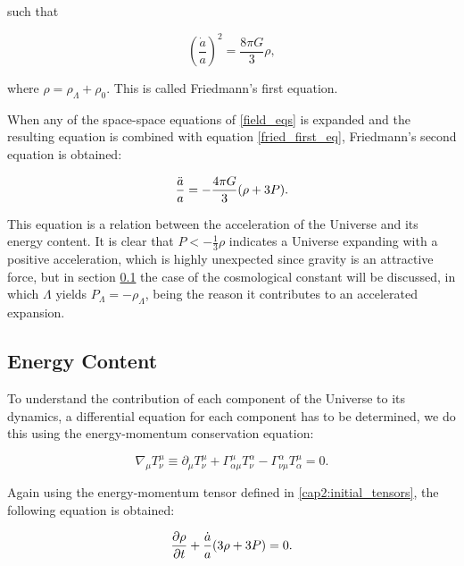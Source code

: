 \documentclass[openany,a4paper,12pt,oneside]{book}
\begin{document}
\begin{spacing}{1.5}
\noindent such that

\begin{equation}\label{fried_first_eq}
    \left(\frac{\dot{a}}{a}\right)^2=\frac{8\pi G}{3}\rho,
\end{equation}

\noindent where $\rho=\rho_\Lambda+\rho_0$. This is called Friedmann's first equation. 

When any of the space-space equations of \eqref{field_eqs} is expanded and the resulting equation is combined with equation \eqref{fried_first_eq}, Friedmann's second equation is obtained:

\begin{equation}\label{fried_second_eq}
    \frac{\Ddot{a}}{a}=-\frac{4\pi G}{3}(\rho+3P).
\end{equation}

This equation is a relation between the acceleration of the Universe and its energy content. It is clear that $P<-\frac{1}{3}\rho$ indicates a Universe expanding with a positive acceleration, which is highly unexpected since gravity is an attractive force, but in section \ref{subsect:Ch2_Energy_Content} the case of the cosmological constant will be discussed, in which $\Lambda$ yields $P_\Lambda=-\rho_\Lambda$, being the reason it contributes to an accelerated expansion.

\subsection{Energy Content}\label{subsect:Ch2_Energy_Content}

To understand the contribution of each component of the Universe to its dynamics, a differential equation for each component has to be determined, we do this using the energy-momentum conservation equation:

\begin{equation}\label{energy_momentum_conservation}
    \nabla_\mu T^\mu_\nu\equiv \partial_\mu T^\mu_\nu+\Gamma^\mu_{\alpha\mu}T^\alpha_\nu-\Gamma^\alpha_{\nu\mu}T^\mu_\alpha=0.
\end{equation}

Again using the energy-momentum tensor defined in \eqref{cap2:initial_tensors}, the following equation is obtained:

\begin{equation}\label{cap2:energy_conservation}
    \pdv{\rho}{t}+\frac{\dot{a}}{a}(3\rho+3P)=0.
\end{equation}


\end{spacing}
\end{document}
